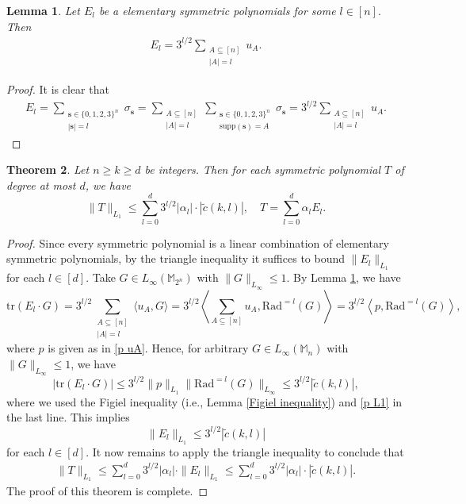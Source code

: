 \documentclass{amsbook}
\newtheorem{theorem}{Theorem}[chapter]
\newtheorem{lemma}[theorem]{Lemma}
\theoremstyle{definition}
\theoremstyle{remark}
\numberwithin{section}{chapter}
\numberwithin{equation}{chapter}
\newcommand{\M}{\mathbb{M}}
\newcommand{\1}{\mathbf{1}}
\newcommand{\s}{\mathbf{s}}
\begin{document}
\begin{lemma}\label{El}
Let $E_l$ be a  elementary symmetric polynomials for some $l\in [n].$ Then
\begin{align*}
E_{l}=3^{l/2}\sum_{\substack{A\subseteq[n]\\|A|=l}}u_{A}.
\end{align*}
\end{lemma}
\begin{proof}
It is clear that
\begin{align*}
E_{l}=\sum_{\substack{\s\in\{0,1,2,3\}^{n}\\|\s|=l}}\sigma_{\s}=\sum_{\substack{A\subseteq [n]\\|A|=l}}\sum_{\substack{\s\in\{0,1,2,3\}^{n}\\\mathrm{supp}(\s)=A}}\sigma_{\s}=3^{l/2}\sum_{\substack{A\subseteq[n]\\|A|=l}}u_{A}.
\end{align*}
\end{proof}


\begin{theorem}\label{upper bound for symmetric polynomials}
Let $n\geq k\geq d$ be integers. Then for each symmetric polynomial $T$ of degree at most $d$, we have
\begin{equation}\label{fundamental L1 bound}
\|T\|_{L_{1}}\leq \sum_{l=0}^{d}3^{l/2}|\alpha_{l}|\cdot|\tilde{c}(k,l)|,\quad T=\sum_{l=0}^{d}\alpha_{l}E_{l}.
\end{equation}
\end{theorem}
\begin{proof}
Since every symmetric polynomial is a linear combination of elementary symmetric polynomials, by the triangle inequality it suffices to bound $\|E_{l}\|_{L_{1}}$ for each $l\in [d]$. 
Take $G\in L_{\infty}(\M_{2^n})$ with $\|G\|_{L_{\infty}}\leq 1$. By Lemma \ref{El}, we have
\begin{equation*}\label{elementary terms}
\mathrm{tr}(E_{l}\cdot G)=3^{l/2}\sum_{\substack{A\subseteq [n]\\|A|=l}}\langle u_{A},G\rangle=3^{l/2}\left\langle \sum_{A\subseteq [n]}u_{A},\mathrm{Rad}^{=l}(G)\right\rangle=3^{l/2}\left\langle p,\mathrm{Rad}^{=l}(G)\right\rangle,
\end{equation*}
where  $p$ is given as in \eqref{p uA}. 
Hence, for arbitrary $G\in L_{\infty}(\M_{n})$ with $\|G\|_{L_{\infty}}\leq 1$, we have
\[
|\mathrm{tr}(E_{l}\cdot G)|\leq 3^{l/2}\|p\|_{L_1}\|\mathrm{Rad}^{=l}(G)\|_{L_{\infty}}\leq 3^{l/2}|\tilde{c}(k,l)|,
\]
where we used the Figiel inequality (i.e., Lemma \ref{Figiel inequality}) and \eqref{p L1} in the last line. This implies $$\|E_{l}\|_{L_{1}}\leq 3^{l/2}|\tilde{c}(k,l)|$$ for each $l\in [d]$.
It now remains to apply the triangle inequality to conclude that
\begin{align*}
\|T\|_{L_{1}}\leq \sum_{l=0}^{d}3^{l/2}|\alpha_{l}|\cdot\|E_{l}\|_{L_{1}}\leq \sum_{l=0}^{d}3^{l/2}|\alpha_{l}|\cdot|\tilde{c}(k,l)|.
\end{align*}
The proof of this theorem is complete.
\end{proof}
\end{document}

